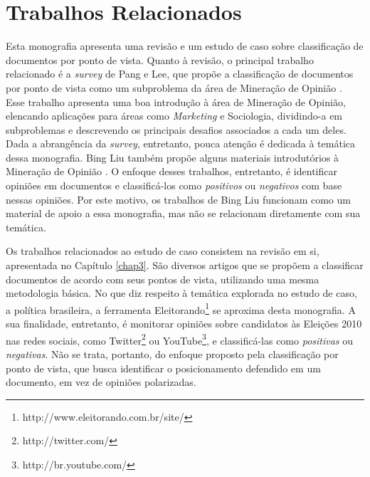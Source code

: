 \section{Trabalhos Relacionados}
\label{relacionados}

Esta monografia apresenta uma revisão e um estudo de caso sobre classificação de documentos por ponto de vista. Quanto à revisão, o principal trabalho relacionado é a \emph{survey} de Pang e Lee, que propõe a classificação de documentos por ponto de vista como um subproblema da área de Mineração de Opinião \cite{omsa}. Esse trabalho apresenta uma boa introdução à área de Mineração de Opinião, elencando aplicações para áreas como \emph{Marketing} e Sociologia,  dividindo-a em subproblemas e descrevendo os principais desafios associados a cada um deles. Dada a abrangência da \emph{survey}, entretanto, pouca atenção é dedicada à temática dessa monografia. Bing Liu também propõe alguns materiais introdutórios à Mineração de Opinião \cite{bingliu, handbook-liu}. O enfoque desses trabalhos, entretanto, é identificar opiniões em documentos e classificá-los como \emph{positivos} ou \emph{negativos} com base nessas opiniões. Por este motivo, os trabalhos de Bing Liu funcionam como um material de apoio a essa monografia, mas não se relacionam diretamente com sua temática. %
 


Os trabalhos relacionados ao estudo de caso consistem na revisão em si, apresentada no Capítulo \ref{chap3}. São diversos artigos que se propõem a classificar documentos de acordo com seus pontos de vista, utilizando uma mesma metodologia básica. No que diz respeito à temática explorada no estudo de caso, a política brasileira, a ferramenta Eleitorando\footnote{http://www.eleitorando.com.br/site/} se aproxima desta monografia. A sua finalidade, entretanto, é monitorar opiniões sobre candidatos às Eleições 2010 nas redes sociais, como Twitter\footnote{http://twitter.com/} ou YouTube\footnote{http://br.youtube.com/}, e classificá-las como \emph{positivas} ou \emph{negativas}. Não se trata, portanto, do enfoque proposto pela classificação por ponto de vista, que busca identificar o posicionamento defendido em um documento, em vez de opiniões polarizadas.



